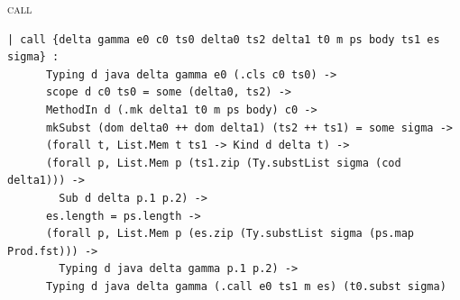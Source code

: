 \begin{cmp}{\textsc{call}}
\begin{paperside}
\end{paperside}
\begin{leanside}
\begin{lstlisting}[style=leanside]
  | call {delta gamma e0 c0 ts0 delta0 ts2 delta1 t0 m ps body ts1 es sigma} :
      Typing d java delta gamma e0 (.cls c0 ts0) ->
      scope d c0 ts0 = some (delta0, ts2) ->
      MethodIn d (.mk delta1 t0 m ps body) c0 ->
      mkSubst (dom delta0 ++ dom delta1) (ts2 ++ ts1) = some sigma ->
      (forall t, List.Mem t ts1 -> Kind d delta t) ->
      (forall p, List.Mem p (ts1.zip (Ty.substList sigma (cod delta1))) ->
        Sub d delta p.1 p.2) ->
      es.length = ps.length ->
      (forall p, List.Mem p (es.zip (Ty.substList sigma (ps.map Prod.fst))) ->
        Typing d java delta gamma p.1 p.2) ->
      Typing d java delta gamma (.call e0 ts1 m es) (t0.subst sigma)
\end{lstlisting}
\end{leanside}
\end{cmp}

